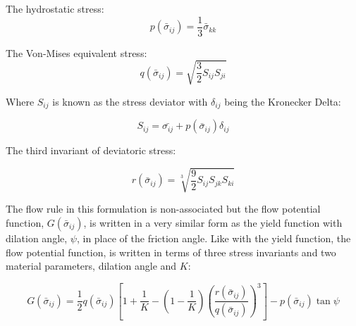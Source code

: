 The hydrostatic stress:
\begin{equation}
p\left(\bar{\sigma}_{ij}\right)=\frac{1}{3}\bar{\sigma}_{kk}
\label{eqn:druc3}
\end{equation}

The Von-Mises equivalent stress:
\begin{equation}
q\left(\bar{\sigma}_{ij}\right)=\sqrt{\frac{3}{2}S_{ij}S_{ji}}\label{eqn:druc4}
\end{equation}

Where $S_{ij}$ is known as the stress deviator with $\delta_{ij}$ being the Kronecker Delta:

\begin{equation}
S_{ij} = \bar{\sigma_{ij}} + p\left(\bar{\sigma}_{ij}\right)\delta_{ij}
\label{eqn:druc4-1}
\end{equation}

The third invariant of deviatoric stress:

\begin{equation}
r\left(\bar{\sigma}_{ij}\right)= \sqrt[3]{\frac{9}{2}S_{ij} S_{jk} S_{ki}}
\label{eqn:druc4-2}
\end{equation}




The flow rule in this formulation is non-associated but the flow potential function, $G\left(\bar{\sigma}_{ij}\right)$, is written in a very similar form as the yield function with dilation angle, $\psi$, in place of the friction angle. Like with the yield function, the flow potential function, is written in terms of three stress invariants and two material parameters, dilation angle and $K$:

\begin{equation}
G\left(\bar{\sigma}_{ij}\right)=\frac{1}{2}q\left(\bar{\sigma}_{ij}\right)\left [ 1+\frac{1}{K}-\left ( 1-\frac{1}{K} \right )\left ( \frac{r\left(\bar{\sigma}_{ij}\right)}{q\left(\bar{\sigma}_{ij}\right)} \right )^3 \right ]-p\left(\bar{\sigma}_{ij}\right)\tan\psi\label{eqn:const11}
\end{equation}

